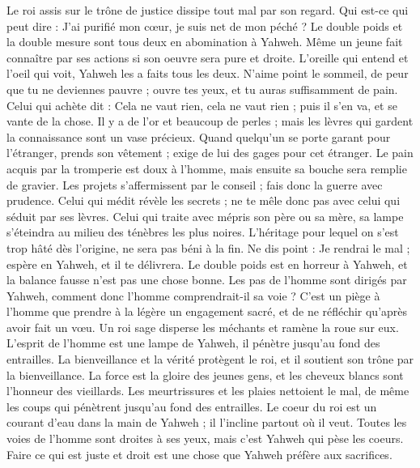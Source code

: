 \begin{multicols}{2}
Le roi assis sur le trône de justice dissipe tout mal par son regard.
Qui est-ce qui peut dire : J'ai purifié mon cœur, je suis net de mon péché ?
Le double poids et la double mesure sont tous deux en abomination à Yahweh.
Même un jeune fait connaître par ses actions si son oeuvre sera pure et droite.
L'oreille qui entend et l'oeil qui voit, Yahweh les a faits tous les deux.
N'aime point le sommeil, de peur que tu ne deviennes pauvre ; ouvre tes yeux, et tu auras suffisamment de pain.
Celui qui achète dit : Cela ne vaut rien, cela ne vaut rien ; puis il s'en va, et se vante de la chose.
Il y a de l'or et beaucoup de perles ; mais les lèvres qui gardent la connaissance sont un vase précieux.
Quand quelqu'un se porte garant pour l'étranger, prends son vêtement ;  exige de lui des gages pour cet étranger.
Le pain acquis par la tromperie est doux à l'homme, mais ensuite sa bouche sera remplie de gravier.
Les projets s'affermissent par le conseil ; fais donc la guerre avec prudence.
Celui qui médit révèle les secrets ; ne te mêle donc pas avec celui qui séduit par ses lèvres.
Celui qui traite avec mépris son père ou sa mère, sa lampe s’éteindra au milieu des ténèbres les plus noires.
L'héritage pour lequel on s'est trop hâté dès l’origine, ne sera pas béni à la fin.
Ne dis point : Je rendrai le mal ; espère en Yahweh, et il te délivrera.
Le double poids est en horreur à Yahweh, et la balance fausse n'est pas une chose bonne.
Les pas de l'homme sont dirigés par Yahweh, comment donc l'homme comprendrait-il sa voie ?
C'est un piège à l'homme que prendre à la légère un engagement sacré, et de ne réfléchir qu’après avoir fait un vœu.
Un roi sage disperse les méchants et ramène la roue sur eux.
L'esprit de l'homme est une lampe de Yahweh, il pénètre jusqu’au fond des entrailles.
La bienveillance et la vérité protègent le roi, et il soutient son trône par la bienveillance.
La force est la gloire des jeunes gens, et les cheveux blancs sont l'honneur des vieillards.
Les meurtrissures et les plaies nettoient le mal, de même les coups qui pénètrent jusqu'au fond des entrailles.
\VerseOne{}Le coeur du roi est un courant d’eau dans la main de Yahweh ; il l'incline partout où il veut.
Toutes les voies de l'homme sont droites à ses yeux, mais c’est Yahweh qui pèse les coeurs.
Faire ce qui est juste et droit est une chose que Yahweh préfère aux sacrifices.

\end{multicols}
